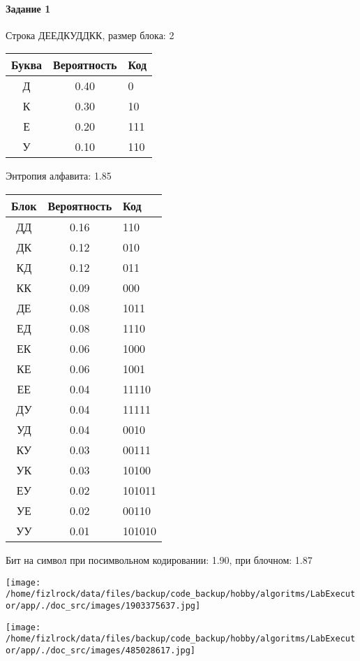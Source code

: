 \documentclass[a4paper, 12pt]{article}
\begin{document}
\paragraph{Задание 1}

Строка ДЕЕДКУДДКК, размер блока: 2
\begin{center}
 \begin{tabular}{ |c|c|l| } 
  \hline
     Буква & Вероятность & Код\\ \hline
Д & 0.40 & 0\\\hline
К & 0.30 & 10\\\hline
Е & 0.20 & 111\\\hline
У & 0.10 & 110
\\ \hline \end{tabular}
\end{center}
Энтропия алфавита: 1.85
\begin{center}
 \begin{tabular}{ |c|c|l| } 
  \hline
     Блок & Вероятность & Код\\ \hline
ДД & 0.16 & 110\\\hline
ДК & 0.12 & 010\\\hline
КД & 0.12 & 011\\\hline
КК & 0.09 & 000\\\hline
ДЕ & 0.08 & 1011\\\hline
ЕД & 0.08 & 1110\\\hline
ЕК & 0.06 & 1000\\\hline
КЕ & 0.06 & 1001\\\hline
ЕЕ & 0.04 & 11110\\\hline
ДУ & 0.04 & 11111\\\hline
УД & 0.04 & 0010\\\hline
КУ & 0.03 & 00111\\\hline
УК & 0.03 & 10100\\\hline
ЕУ & 0.02 & 101011\\\hline
УЕ & 0.02 & 00110\\\hline
УУ & 0.01 & 101010
\\ \hline \end{tabular}
\end{center}
Бит на символ при посимвольном кодировании: 1.90, при блочном: 1.87

\texttt{[image: /home/fizlrock/data/files/backup/code\_backup/hobby/algoritms/LabExecutor/app/./doc\_src/images/1903375637.jpg]}

\texttt{[image: /home/fizlrock/data/files/backup/code\_backup/hobby/algoritms/LabExecutor/app/./doc\_src/images/485028617.jpg]}
\pagebreak
\end{document}
